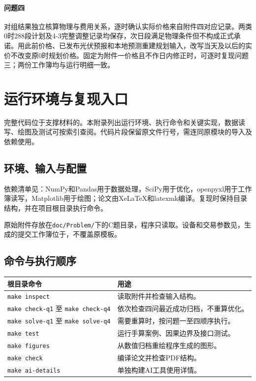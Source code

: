 \paragraph{问题四}
对\QFourStrategyCount 组结果独立核算物理与费用关系，逐时确认实际价格来自附件四对应记录。两类0时288段计划及4-3完整调整记录均保存，次日段满足物理条件但不构成正式承诺。用此前价格、已发布光伏预报和本地预测重建规划输入，改写当天及以后的实价不改变原0时规划价格。固定为附件一价格且不作日内修正时，可逐时复现问题三；两份工作簿均与运行明细一致。



\FloatBarrier

\FloatBarrier
\FloatBarrier
\section{运行环境与复现入口}
\label{app:reproduction}

完整代码位于支撑材料的。本附录列出运行环境、执行命令和关键实现，数据读写、绘图及测试可按索引查阅。代码片段保留原文件行号，需连同原模块的导入及依赖使用。

\subsection{环境、输入与配置}

依赖清单见：NumPy和Pandas用于数据处理，SciPy用于优化，openpyxl用于工作簿读写，Matplotlib用于绘图；论文由XeLaTeX和latexmk编译。复现时保持目录结构，并在项目根目录执行命令。

原始附件存放在\texttt{doc/Problem/}下的C题目录，程序只读取。设备和交易参数见，生成的提交工作簿位于，不覆盖原模板。

\subsection{命令与执行顺序}

\noindent\begin{tabularx}{\textwidth}{p{}L}
\toprule
根目录命令 & 用途 \\
\midrule
\texttt{make inspect} & 读取附件并检查输入结构。 \\
\texttt{make check-q1} 至 \texttt{make check-q4} & 依次检查四问最近成功归档，不重算优化。 \\
\texttt{make solve-q1} 至 \texttt{make solve-q4} & 需要重算时，按问题一至四顺序执行。 \\
\texttt{make test} & 运行手算案例、因果边界及接口测试。 \\
\texttt{make figures} & 从数值归档重绘程序生成的图形。 \\
\texttt{make check} & 编译论文并检查PDF结构。 \\
\texttt{make ai-details} & 单独构建AI工具使用详情。 \\
\bottomrule
\end{tabularx}

